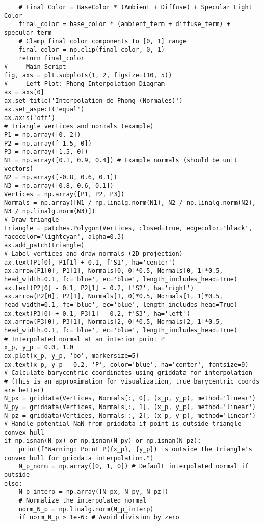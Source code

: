 \begin{verbatim}
    # Final Color = BaseColor * (Ambient + Diffuse) + Specular Light Color
    final_color = base_color * (ambient_term + diffuse_term) + specular_term
    # Clamp final color components to [0, 1] range
    final_color = np.clip(final_color, 0, 1)
    return final_color
# --- Main Script ---
fig, axs = plt.subplots(1, 2, figsize=(10, 5))
# --- Left Plot: Phong Interpolation Diagram ---
ax = axs[0]
ax.set_title('Interpolation de Phong (Normales)')
ax.set_aspect('equal')
ax.axis('off')
# Triangle vertices and normals (example)
P1 = np.array([0, 2])
P2 = np.array([-1.5, 0])
P3 = np.array([1.5, 0])
N1 = np.array([0.1, 0.9, 0.4]) # Example normals (should be unit vectors)
N2 = np.array([-0.8, 0.6, 0.1])
N3 = np.array([0.8, 0.6, 0.1])
Vertices = np.array([P1, P2, P3])
Normals = np.array([N1 / np.linalg.norm(N1), N2 / np.linalg.norm(N2), N3 / np.linalg.norm(N3)])
# Draw triangle
triangle = patches.Polygon(Vertices, closed=True, edgecolor='black', facecolor='lightcyan', alpha=0.3)
ax.add_patch(triangle)
# Label vertices and draw normals (2D projection)
ax.text(P1[0], P1[1] + 0.1, f'S1', ha='center')
ax.arrow(P1[0], P1[1], Normals[0, 0]*0.5, Normals[0, 1]*0.5, head_width=0.1, fc='blue', ec='blue', length_includes_head=True)
ax.text(P2[0] - 0.1, P2[1] - 0.2, f'S2', ha='right')
ax.arrow(P2[0], P2[1], Normals[1, 0]*0.5, Normals[1, 1]*0.5, head_width=0.1, fc='blue', ec='blue', length_includes_head=True)
ax.text(P3[0] + 0.1, P3[1] - 0.2, f'S3', ha='left')
ax.arrow(P3[0], P3[1], Normals[2, 0]*0.5, Normals[2, 1]*0.5, head_width=0.1, fc='blue', ec='blue', length_includes_head=True)
# Interpolated normal at an interior point P
x_p, y_p = 0.0, 1.0
ax.plot(x_p, y_p, 'bo', markersize=5)
ax.text(x_p, y_p - 0.2, 'P', color='blue', ha='center', fontsize=9)
# Calculate barycentric coordinates using griddata for interpolation
# (This is an approximation for visualization, true barycentric coords are better)
N_px = griddata(Vertices, Normals[:, 0], (x_p, y_p), method='linear')
N_py = griddata(Vertices, Normals[:, 1], (x_p, y_p), method='linear')
N_pz = griddata(Vertices, Normals[:, 2], (x_p, y_p), method='linear')
# Handle potential NaN from griddata if point is outside triangle convex hull
if np.isnan(N_px) or np.isnan(N_py) or np.isnan(N_pz):
    print(f"Warning: Point P({x_p}, {y_p}) is outside the triangle's convex hull for griddata interpolation.")
    N_p_norm = np.array([0, 1, 0]) # Default interpolated normal if outside
else:
    N_p_interp = np.array([N_px, N_py, N_pz])
    # Normalize the interpolated normal
    norm_N_p = np.linalg.norm(N_p_interp)
    if norm_N_p > 1e-6: # Avoid division by zero

\end{verbatim}
